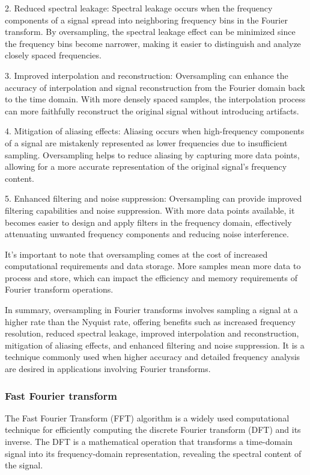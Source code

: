 2. Reduced spectral leakage: Spectral leakage occurs when the frequency components of a signal spread into neighboring frequency bins in the Fourier transform. By oversampling, the spectral leakage effect can be minimized since the frequency bins become narrower, making it easier to distinguish and analyze closely spaced frequencies.

3. Improved interpolation and reconstruction: Oversampling can enhance the accuracy of interpolation and signal reconstruction from the Fourier domain back to the time domain. With more densely spaced samples, the interpolation process can more faithfully reconstruct the original signal without introducing artifacts.

4. Mitigation of aliasing effects: Aliasing occurs when high-frequency components of a signal are mistakenly represented as lower frequencies due to insufficient sampling. Oversampling helps to reduce aliasing by capturing more data points, allowing for a more accurate representation of the original signal's frequency content.

5. Enhanced filtering and noise suppression: Oversampling can provide improved filtering capabilities and noise suppression. With more data points available, it becomes easier to design and apply filters in the frequency domain, effectively attenuating unwanted frequency components and reducing noise interference.

It's important to note that oversampling comes at the cost of increased computational requirements and data storage. More samples mean more data to process and store, which can impact the efficiency and memory requirements of Fourier transform operations.

In summary, oversampling in Fourier transforms involves sampling a signal at a higher rate than the Nyquist rate, offering benefits such as increased frequency resolution, reduced spectral leakage, improved interpolation and reconstruction, mitigation of aliasing effects, and enhanced filtering and noise suppression. It is a technique commonly used when higher accuracy and detailed frequency analysis are desired in applications involving Fourier transforms.

\subsubsection{Fast Fourier transform}

The Fast Fourier Transform (FFT) algorithm is a widely used computational technique for efficiently computing the discrete Fourier transform (DFT) and its inverse.
The DFT is a mathematical operation that transforms a time-domain signal into its frequency-domain representation, revealing the spectral content of the signal.

